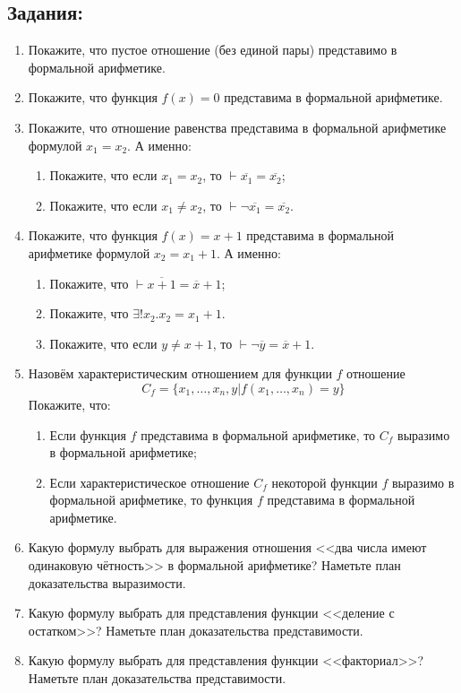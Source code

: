 \documentclass[10pt,a4paper,oneside]{article}
\begin{document}
\subsection*{Задания:}
\begin{enumerate}
\item Покажите, что пустое отношение (без единой пары) представимо в формальной арифметике.
\item Покажите, что функция $f(x)=0$ представима в формальной арифметике.
\item Покажите, что отношение равенства представима в формальной арифметике формулой $x_1=x_2$. А именно:
\begin{enumerate}
\item Покажите, что если $x_1=x_2$, то $\vdash \overline{x_1} = \overline{x_2}$;
\item Покажите, что если $x_1\ne x_2$, то $\vdash \neg \overline{x_1} = \overline{x_2}$.
\end{enumerate}
\item Покажите, что функция $f(x)=x+1$ представима в формальной арифметике формулой $x_2=x_1+1$. А именно:
\begin{enumerate}
\item Покажите, что $\vdash \overline{x+1} = \overline{x}+1$;
\item Покажите, что $\exists ! x_2 . x_2 = x_1+1$.
\item Покажите, что если $y \ne x+1$, то $\vdash \neg\overline{y} = \overline{x}+1$.
\end{enumerate}
\item Назовём характеристическим отношением для функции $f$ отношение $$C_f = \{x_1,\dots,x_n,y | f(x_1,\dots,x_n)=y\}$$
Покажите, что:
\begin{enumerate}
\item Если функция $f$ представима в формальной арифметике, то $C_f$ выразимо в формальной арифметике;
\item Если характеристическое отношение $C_f$ некоторой функции $f$ выразимо в формальной арифметике,
то функция $f$ представима в формальной арифметике.
\end{enumerate}
\item Какую формулу выбрать для выражения отношения <<два числа имеют одинаковую чётность>> в формальной арифметике?
Наметьте план доказательства выразимости.
\item Какую формулу выбрать для представления функции <<деление с остатком>>?
Наметьте план доказательства представимости.
\item Какую формулу выбрать для представления функции <<факториал>>? Наметьте план доказательства представимости.
\end{enumerate}
\end{document}
